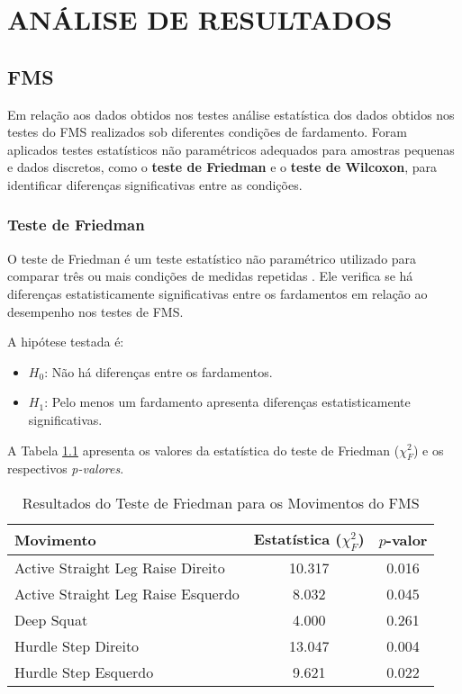 \chapter{ANÁLISE DE RESULTADOS}

\section{\acrshort{FMS}}

    Em relação aos dados obtidos nos testes análise estatística dos dados obtidos nos testes do \acrlong{FMS} realizados sob diferentes condições de fardamento. Foram aplicados testes estatísticos não paramétricos adequados para amostras pequenas e dados discretos, como o \textbf{teste de Friedman} e o \textbf{teste de Wilcoxon}, para identificar diferenças significativas entre as condições.

    \subsection{Teste de Friedman}
        O teste de Friedman é um teste estatístico não paramétrico utilizado para comparar três ou mais condições de medidas repetidas \cite{sheldon1996use}. Ele verifica se há diferenças estatisticamente significativas entre os fardamentos em relação ao desempenho nos testes de FMS.

        A hipótese testada é:
        \begin{itemize}
            \item $H_0$: Não há diferenças entre os fardamentos.
            \item $H_1$: Pelo menos um fardamento apresenta diferenças estatisticamente significativas.
            \end{itemize}

        A Tabela \ref{tab:friedman} apresenta os valores da estatística do teste de Friedman ($\chi^2_F$) e os respectivos \textit{p-valores}.

        \begin{table}[H]
            \centering
            \caption{Resultados do Teste de Friedman para os Movimentos do FMS}
            \label{tab:friedman}
            \begin{tabular}{lcc}
                \hline
                \textbf{Movimento} & \textbf{Estatística ($\chi^2_F$)} & \textbf{$p$-valor} \\
                \hline
                Active Straight Leg Raise Direito  & 10.317 & 0.016  \\
                Active Straight Leg Raise Esquerdo &  8.032 & 0.045  \\
                Deep Squat                        &  4.000 & 0.261  \\
                Hurdle Step Direito               & 13.047 & 0.004  \\
                Hurdle Step Esquerdo              &  9.621 & 0.022  \\
                \hline
            \end{tabular}
            \end{table}

